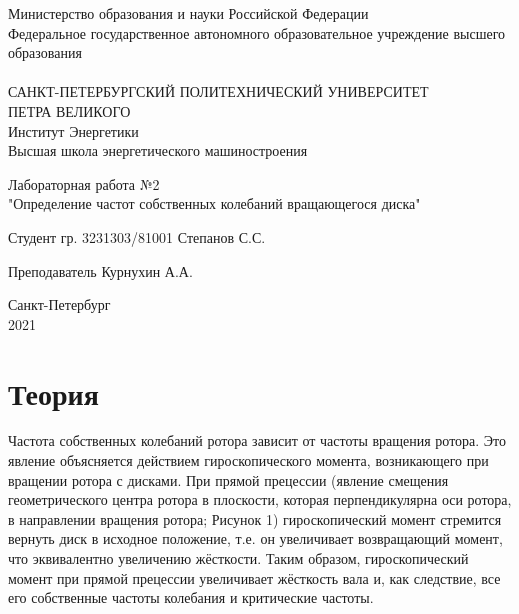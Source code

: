 




\begin{titlepage}

\begin{center}
Министерство образования и науки Российской Федерации\\
Федеральное государственное автономного образовательное учреждение высшего образования\\
\hrulefill\\
\vspace{0.5cm}
САНКТ-ПЕТЕРБУРГСКИЙ ПОЛИТЕХНИЧЕСКИЙ УНИВЕРСИТЕТ\\ ПЕТРА ВЕЛИКОГО\\
\vspace{0.5cm}
Институт Энергетики\\
Высшая школа энергетического машиностроения\\

\end{center}

\vspace{5cm}
\begin{center}
\begin{large}
Лабораторная работа №2\\
"Определение частот собственных колебаний вращающегося диска"
\end{large}
\end{center}

\vspace{5cm}
\hspace{5cm} Студент гр. 3231303/81001 \hrulefill Степанов С.С.


\vspace{0.5cm}
\hspace{5cm} Преподаватель \hrulefill Курнухин А.А. \\


\vfill
\begin{center}
Санкт-Петербург\\
2021
\end{center}


\end{titlepage}

\tableofcontents
\newpage

\section{Теория}
Частота собственных колебаний ротора зависит от частоты вращения ротора. Это явление объясняется действием гироскопического момента, возникающего при вращении ротора с дисками. При прямой прецессии (явление смещения геометрического центра ротора в плоскости, которая перпендикулярна оси ротора, в направлении вращения ротора; Рисунок 1) гироскопический момент стремится вернуть диск в исходное положение, т.е. он увеличивает возвращающий момент, что эквивалентно увеличению жёсткости. Таким образом, гироскопический момент при прямой прецессии увеличивает жёсткость вала и, как следствие, все его собственные частоты колебания и критические частоты.\\

